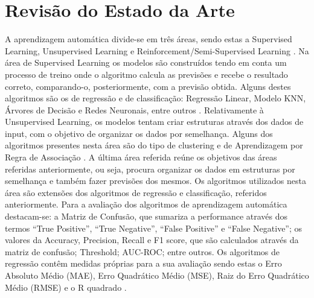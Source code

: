 \documentclass[conference]{IEEEtran}
\begin{document}
\section{Revisão do Estado da Arte} %
A aprendizagem automática divide-se em três áreas, sendo estas a Supervised Learning, Unsupervised Learning e Reinforcement/Semi-Supervised Learning \cite{algorithms}.
Na área de Supervised Learning os modelos são construídos tendo em conta um processo de treino onde o algoritmo calcula as previsões e recebe o resultado correto, comparando-o, posteriormente, com a previsão obtida. Alguns destes algoritmos são os de regressão e de classificação: Regressão Linear, Modelo KNN, Árvores de Decisão e Redes Neuronais, entre outros \cite{regressionalgorithms}.
Relativamente à Unsupervised Learning, os modelos tentam criar estruturas através dos dados de input, com o objetivo de organizar os dados por semelhança. Alguns dos algoritmos presentes nesta área são do tipo de clustering \cite{clusteringalgorithms} e de Aprendizagem por Regra de Associação \cite{associationrulealgorithms}.
A última área referida reúne os objetivos das áreas referidas anteriormente, ou seja, procura organizar os dados em estruturas por semelhança e também fazer previsões dos mesmos. Os algoritmos utilizados nesta área são extensões dos algoritmos de regressão e classificação, referidos anteriormente.
Para a avaliação dos algoritmos de aprendizagem automática destacam-se: a Matriz de Confusão, que sumariza a performance através dos termos “True Positive”, “True Negative”, “False Positive” e “False Negative”; os valores da Accuracy, Precision, Recall e F1 score, que são calculados através da matriz de confusão; Threshold; AUC-ROC; entre outros. Os algoritmos de regressão contêm medidas próprias para a sua avaliação sendo estas o Erro Absoluto Médio (MAE), Erro Quadrático Médio (MSE), Raiz do Erro Quadrático Médio (RMSE) e o R quadrado \cite{evaluationmetrics}.
\end{document}
